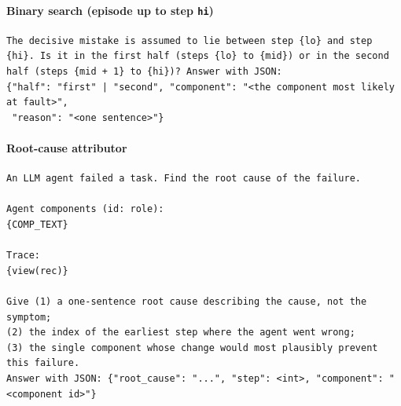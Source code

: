 \paragraph{Binary search (episode up to step \texttt{hi})}
\begin{Verbatim}[fontsize=\scriptsize, breaklines, breakanywhere]
The decisive mistake is assumed to lie between step {lo} and step {hi}. Is it in the first half (steps {lo} to {mid}) or in the second half (steps {mid + 1} to {hi})? Answer with JSON:
{"half": "first" | "second", "component": "<the component most likely at fault>",
 "reason": "<one sentence>"}
\end{Verbatim}

\paragraph{Root-cause attributor}
\begin{Verbatim}[fontsize=\scriptsize, breaklines, breakanywhere]
An LLM agent failed a task. Find the root cause of the failure.

Agent components (id: role):
{COMP_TEXT}

Trace:
{view(rec)}

Give (1) a one-sentence root cause describing the cause, not the symptom;
(2) the index of the earliest step where the agent went wrong;
(3) the single component whose change would most plausibly prevent this failure.
Answer with JSON: {"root_cause": "...", "step": <int>, "component": "<component id>"}
\end{Verbatim}

